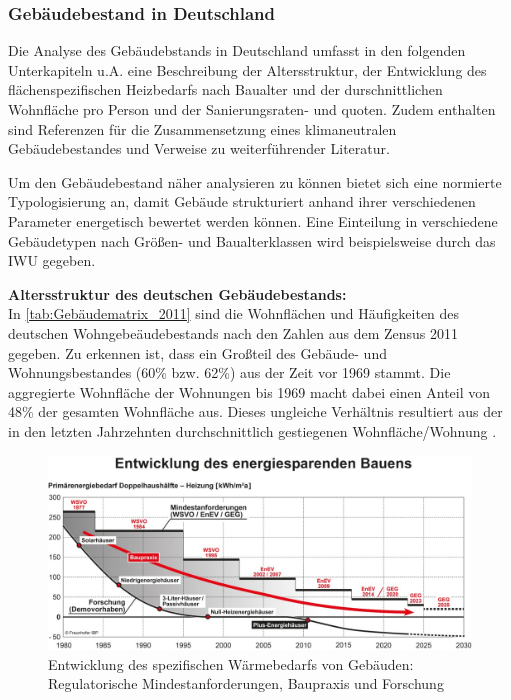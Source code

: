 			\subsubsection{Gebäudebestand in Deutschland}
			\label{sec:Grundlagen:Wärmewende_in_D:Ausgangssituation:Gebäudebestand}
				Die Analyse des Gebäudebstands in Deutschland umfasst in den folgenden Unterkapiteln u.A. eine Beschreibung der Altersstruktur, der Entwicklung des flächenspezifischen Heizbedarfs nach Baualter und der durschnittlichen Wohnfläche pro Person und der Sanierungsraten- und quoten. Zudem enthalten sind Referenzen für die Zusammensetzung eines klimaneutralen Gebäudebestandes und Verweise zu weiterführender Literatur.				
				
				Um den Gebäudebestand näher analysieren zu können bietet sich eine normierte Typologisierung an, damit Gebäude strukturiert anhand ihrer verschiedenen Parameter energetisch bewertet werden können. Eine Einteilung in verschiedene Gebäudetypen nach Größen- und Baualterklassen wird beispielsweise durch das IWU gegeben. \cite{IWU_2015_Wohngebäudetypologie}
				
				\textbf{Altersstruktur des deutschen Gebäudebestands:}\\
				In \autoref{tab:Gebäudematrix_2011} sind die Wohnflächen und Häufigkeiten des deutschen Wohngebeäudebestands nach den Zahlen aus dem Zensus 2011 gegeben. Zu erkennen ist, dass ein Großteil des Gebäude- und Wohnungsbestandes (60\% bzw. 62\%) aus der Zeit vor 1969 stammt. Die aggregierte Wohnfläche der Wohnungen bis 1969 macht dabei einen Anteil von 48\% der gesamten Wohnfläche aus. Dieses ungleiche Verhältnis resultiert aus der in den letzten Jahrzehnten durchschnittlich gestiegenen Wohnfläche/Wohnung \cite{IWU_2015_Wohngebäudetypologie}.
				
				\begin{figure}[H]
					\includegraphics[width=\linewidth]{Medien/own/Fraunhofer_IBP_Entwicklung_des_energiesparenden_Bauens_1980_bis_2020.jpg}
					\caption{Entwicklung des spezifischen Wärmebedarfs von Gebäuden: Regulatorische Mindestanforderungen, Baupraxis und Forschung \cite{IBP_Abb_Entwicklung_Energiesparendes_Bauen}}
					\label{fig:Entwicklung_Energiesparendes_Bauen}
				\end{figure}
			
